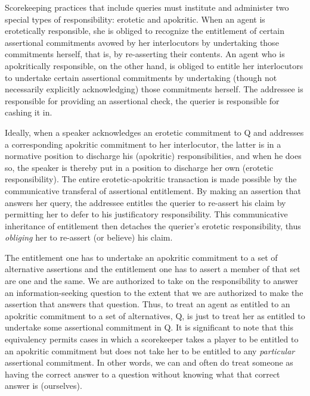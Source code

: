 \documentclass{article}                     %
\begin{document}
Scorekeeping practices that include queries must institute and administer
two special types of responsibility: erotetic and apokritic. When
an agent is erotetically responsible, she is obliged to recognize
the entitlement of certain assertional commitments avowed by her interlocutors
by undertaking those commitments herself, that is, by re-asserting
their contents. An agent who is apokritically responsible, on the
other hand, is obliged to entitle her interlocutors to undertake certain
assertional commitments by undertaking (though not necessarily explicitly
acknowledging) those commitments herself. The addressee is responsible
for providing an assertional check, the querier is responsible for
cashing it in.

Ideally, when a speaker acknowledges an erotetic commitment to Q and
addresses a corresponding apokritic commitment to her interlocutor,
the latter is in a normative position to discharge his (apokritic)
responsibilities, and when he does so, the speaker is thereby put
in a position to discharge her own (erotetic responsibility). The
entire erotetic-apokritic transaction is made possible by the communicative
transferal of assertional entitlement. By making an assertion that
answers her query, the addressee entitles the querier to re-assert
his claim by permitting her to defer to his justificatory responsibility.
This communicative inheritance of entitlement then detaches the querier's
erotetic responsibility, thus \emph{obliging} her to re-assert (or
believe) his claim.

The entitlement one has to undertake an apokritic commitment to a
set of alternative assertions and the entitlement one has to assert
a member of that set are one and the same. We are authorized to take
on the responsibility to answer an information-seeking question to
the extent that we are authorized to make the assertion that answers
that question. Thus, to treat an agent as entitled to an apokritic
commitment to a set of alternatives, Q, is just to treat her as entitled
to undertake some assertional commitment in Q. It is significant to
note that this equivalency permits cases in which a scorekeeper takes
a player to be entitled to an apokritic commitment but does not take
her to be entitled to any \emph{particular} assertional commitment.
In other words, we can and often do treat someone as having the correct
answer to a question without knowing what that correct answer is (ourselves).
\end{document}
